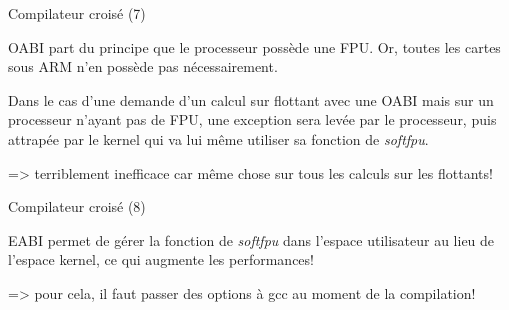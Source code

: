 \documentclass[12pt, t]{beamer}
\begin{document}
\begin{frame}{Compilateur croisé (7)}

    \vspace{15pt}
    OABI part du principe que le processeur possède une FPU. Or, toutes les
    cartes sous ARM n'en possède pas nécessairement.

    {
        \vspace{15pt}
        Dans le cas d'une demande d'un calcul sur flottant avec une OABI mais
        sur un processeur n'ayant pas de FPU, une exception sera levée par le
        processeur, puis attrapée par le kernel qui va lui même utiliser sa
        fonction de {\textit{softfpu}}.
    }

    {
        \vspace{15pt}
        => terriblement inefficace car même chose sur tous les calculs sur les
        flottants!
    }
\end{frame}

\begin{frame}{Compilateur croisé (8)}

    \vspace{15pt}
    EABI permet de gérer la fonction de {\textit{softfpu}} dans l'espace
    utilisateur au lieu de l'espace kernel, ce qui augmente les performances!

    \vspace{15pt}
    => pour cela, il faut passer des options à gcc au moment de la compilation!
\end{frame}
\end{document}
